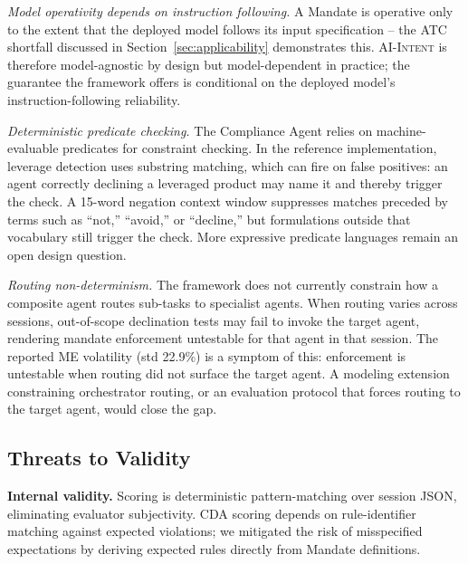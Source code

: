 \documentclass[runningheads]{llncs}
\begin{document}
\textit{Model operativity depends on instruction following.} A Mandate is operative only to the extent that the deployed model follows its input specification -- the ATC shortfall discussed in Section~\ref{sec:applicability} demonstrates this. 
\textsc{AI-Intent} is therefore model-agnostic by design but model-dependent in practice; the guarantee the framework offers is conditional on the deployed model's instruction-following reliability.

\textit{Deterministic predicate checking.} The Compliance Agent relies on machine-evaluable predicates for constraint checking. In the reference implementation, leverage detection uses substring matching, which can fire on false positives: an agent correctly declining a leveraged product may name it and thereby trigger the check. 
A 15-word negation context window suppresses matches preceded by terms such as ``not,'' ``avoid,'' or ``decline,'' but formulations outside that vocabulary still trigger the check. More expressive predicate languages remain an open design question.

\textit{Routing non-determinism.} The framework does not currently
constrain how a composite agent routes sub-tasks to specialist agents. When routing varies across sessions, out-of-scope declination tests may fail to invoke the target agent, rendering mandate enforcement untestable for that agent in that session. 
The reported ME volatility (std 22.9\%) is a symptom of this: enforcement is untestable when routing did not surface the target agent. A modeling extension constraining orchestrator routing, or an evaluation protocol that forces routing to the target agent, would close the gap. 


\subsection{Threats to Validity}

\textbf{Internal validity.} Scoring is deterministic pattern-matching over session JSON, eliminating evaluator subjectivity. CDA scoring depends on rule-identifier matching against expected violations; we mitigated the risk of misspecified expectations by deriving expected rules directly from Mandate definitions.
\end{document}
